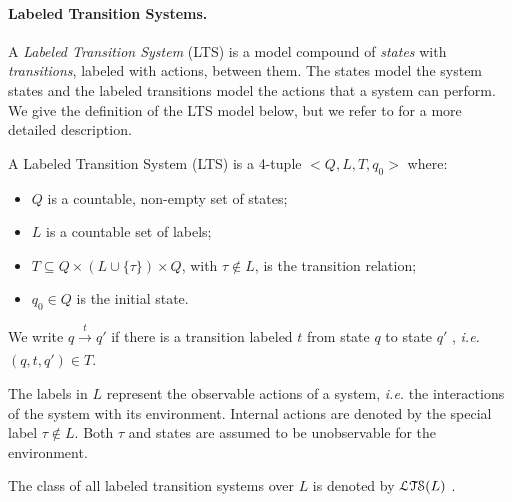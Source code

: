 \paragraph{Labeled Transition Systems.}
\label{sec:definitions:lts}

A \textit{Labeled Transition System} (LTS)
\cite{milner1980calculus} is a model compound of \emph{states}
with \emph{transitions}, labeled with actions, between them.  The
states model the system states and the labeled transitions model
the actions that a system can perform.  We give the definition of
the LTS model below, but we refer to \cite{Tre96,ltsTretmans} for
a more detailed description.

\begin{definition}
    A Labeled Transition System (LTS) is a 4-tuple $<Q,L,T,q_0>$
    where:

    \begin{itemize}
    \item $Q$ is a countable, non-empty set of states;

    \item $L$ is a countable set of labels;

    \item $T \subseteq Q \times (L \cup \{\tau\}) \times Q$, with
    $\tau \not\in L$, is the transition relation;

    \item $q_0 \in Q$ is the initial state.

    \end{itemize}

    We write $q \xrightarrow[]{t} q'$ if there is a transition
    labeled $t$ from state $q$ to state $q'$ , \emph{i.e.} $(q,
    t, q') \in T$.

    The labels in $L$ represent the observable actions of a
    system, \emph{i.e.} the interactions of the system with its
    environment.  Internal actions are denoted by the special
    label $\tau \not\in L$. Both $\tau$ and states are assumed to
    be unobservable for the environment.

    The class of all labeled transition systems over $L$ is
    denoted by $\EuScript{LTS}(L)$ \cite{Tre96}.

	\label{def:lts}
\end{definition}

